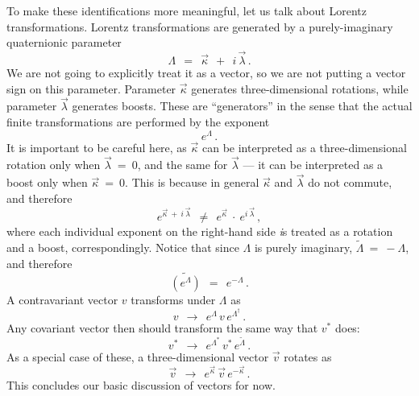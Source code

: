 \documentclass[epsfig,12pt]{article}
\newcommand{\wt}{\widetilde}
\begin{document}
	To make these identifications more meaningful, let us talk about Lorentz transformations.
	Lorentz transformations are generated by a purely-imaginary quaternionic parameter
\begin{equation}
	\Lambda		~~=~~	\vec\kappa  ~~+~~  i\,\vec\lambda\,.
\end{equation}
	We are not going to explicitly treat it as a vector, so we are not putting a vector sign on this parameter.
	Parameter $ \vec\kappa $ generates three-dimensional rotations, while parameter $ \vec\lambda $
	generates boosts.
	These are ``generators'' in the sense that the actual finite transformations are performed by the exponent
\begin{equation}
	e^\Lambda\,.
\end{equation}
	It is important to be careful here, as $ \vec\kappa $ can be interpreted as a three-dimensional rotation
	only when $ \vec\lambda ~=~ 0 $, and the same for $ \vec\lambda $ --- it can be interpreted as a boost
	only when $ \vec\kappa ~=~ 0 $.
	This is because in general $ \vec\kappa $ and $ \vec\lambda $ do not commute, and therefore
\begin{equation}
	e^{\vec\kappa ~+~ i\,\vec\lambda}	~~\neq~~	e^{\vec\kappa}  ~\cdot~  e^{i\,\vec\lambda}\,,
\end{equation}
	where each individual exponent on the right-hand side {\emph is} treated as a rotation and a boost,
	correspondingly.
	Notice that since $ \Lambda $ is purely imaginary, $ \wt\Lambda ~=~ -\Lambda $, and therefore
\begin{equation}
	\wt{(e^\Lambda)}		~~=~~	e^{-\Lambda}\,.
\end{equation}
	A contravariant vector $ v $ transforms under $ \Lambda $ as
\begin{equation}
\label{contra}
	v	~~\to~~		e^\Lambda\,v\,e^{\Lambda^\dag}\,.
\end{equation}
	Any covariant vector then should transform the same way that $ v^* $ does:
\begin{equation}
\label{co}
	v^*	~~\to~~		e^{\Lambda^*}\,v^*\,e^{\wt\Lambda}\,.
\end{equation}
	As a special case of these, a three-dimensional vector $ \vec v $ rotates as
\begin{equation}
\label{rotation}
	\vec v	~~\to~~		e^{\vec\kappa}\,\vec v\,e^{-\vec\kappa}\,.
\end{equation}
	This concludes our basic discussion of vectors for now.
\end{document}
